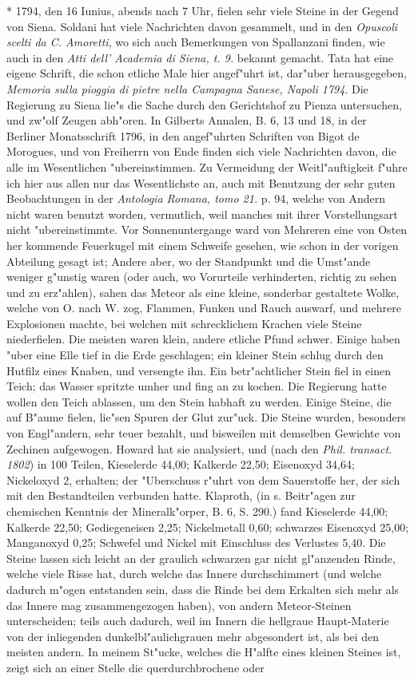 \documentclass[a4paper, 11pt, oneside, polutonikogreek, german]{article}
\begin{document}
* 1794, den 16 Iunius, abends nach 7 Uhr, fielen sehr viele Steine in der Gegend von Siena. Soldani hat viele Nachrichten davon gesammelt, und in den \emph{Opuscoli scelti da C. Amoretti}, wo sich auch Bemerkungen von Spallanzani finden, wie auch in den \emph{Atti dell' Academia di Siena, t. 9.} bekannt gemacht. Tata hat eine eigene Schrift, die schon etliche Male hier angef"uhrt ist, dar"uber herausgegeben, \emph{Memoria sulla pioggia di pietre nella Campagna Sanese, Napoli 1794}. Die Regierung zu Siena lie"s die Sache durch den Gerichtshof zu Pienza untersuchen, und zw"olf Zeugen abh"oren. In Gilberts Annalen, B. 6, 13 und 18, in der Berliner Monatsschrift 1796, in den angef"uhrten Schriften von Bigot de Morogues, und von Freiherrn von Ende finden sich viele Nachrichten davon, die alle im Wesentlichen "ubereinstimmen. Zu Vermeidung der Weitl"auftigkeit f"uhre ich hier aus allen nur das Wesentlichste an, auch mit Benutzung der sehr guten Beobachtungen in der \emph{Antologia Romana, tomo 21.} p. 94, welche von Andern nicht waren benutzt worden, vermutlich, weil manches mit ihrer Vorstellungsart nicht "ubereinstimmte. Vor Sonnenuntergange ward von Mehreren eine von Osten her kommende Feuerkugel mit einem Schweife gesehen, wie schon in der vorigen Abteilung gesagt ist; Andere aber, wo der Standpunkt und die Umst"ande weniger g"unstig waren (oder auch, wo Vorurteile verhinderten, richtig zu sehen und zu erz"ahlen), sahen das Meteor als eine kleine, sonderbar gestaltete Wolke, welche von O. nach W. zog, Flammen, Funken und Rauch auswarf, und mehrere Explosionen machte, bei welchen mit schrecklichem Krachen viele Steine niederfielen. Die meisten waren klein, andere etliche Pfund schwer. Einige haben "uber eine Elle tief in die Erde geschlagen; ein kleiner Stein schlug durch den Hutfilz eines Knaben, und versengte ihn. Ein betr"achtlicher Stein fiel in einen Teich; das Wasser spritzte umher und fing an zu kochen. Die Regierung hatte wollen den Teich ablassen, um den Stein habhaft zu werden. Einige Steine, die auf B"aume fielen, lie"sen Spuren der Glut zur"uck. Die Steine wurden, besonders von Engl"andern, sehr teuer bezahlt, und bisweilen mit demselben Gewichte von Zechinen aufgewogen. Howard hat sie analysiert, und (nach den \emph{Phil. transact. 1802}) in 100 Teilen, Kieselerde 44,00; Kalkerde 22,50; Eisenoxyd 34,64; Nickeloxyd 2, erhalten; der "Uberschuss r"uhrt von dem Sauerstoffe her, der sich mit den Bestandteilen verbunden hatte. Klaproth, (in s. Beitr"agen zur chemischen Kenntnis der Mineralk"orper, B. 6, S. 290.) fand Kieselerde 44,00; Kalkerde 22,50; Gediegeneisen 2,25; Nickelmetall 0,60; schwarzes Eisenoxyd 25,00; Manganoxyd 0,25; Schwefel und Nickel mit Einschluss des Verlustes 5,40. Die Steine lassen sich leicht an der graulich schwarzen gar nicht gl"anzenden Rinde, welche viele Risse hat, durch welche das Innere durchschimmert (und welche dadurch m"ogen entstanden sein, dass die Rinde bei dem Erkalten sich mehr als das Innere mag zusammengezogen haben), von andern Meteor-Steinen unterscheiden; teils auch dadurch, weil im Innern die hellgraue Haupt-Materie von der inliegenden dunkelbl"aulichgrauen mehr abgesondert ist, als bei den meisten andern. In meinem St"ucke, welches die H"alfte eines kleinen Steines ist, zeigt sich an einer Stelle die querdurchbrochene oder 
\end{document}
